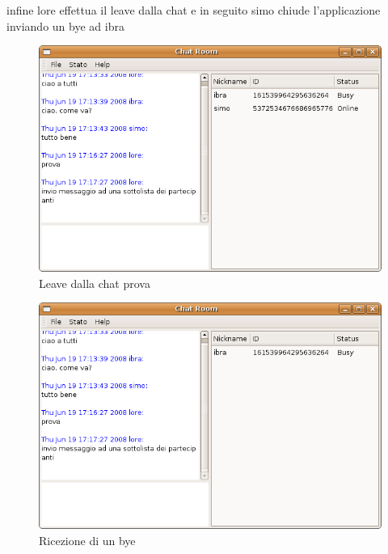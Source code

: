 infine lore effettua il leave dalla chat e in seguito simo chiude l'applicazione inviando un bye ad ibra
\begin{figure}[H]
\begin{center}
\includegraphics[scale=0.5]{etc/leave_lore.png}
\caption{Leave dalla chat prova}
\label{leave\_lore}
\end{center}
\end{figure}
\begin{figure}[H]
\begin{center}
\includegraphics[scale=0.5]{etc/bye_simo.png}
\caption{Ricezione di un bye}
\label{bye\_simo}
\end{center}
\end{figure}

